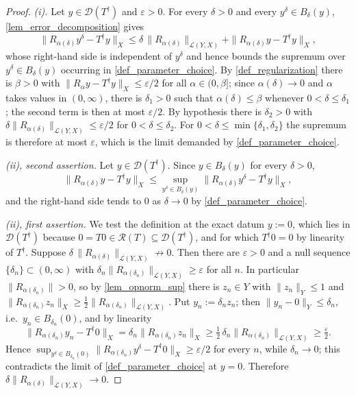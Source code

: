 \documentclass[a4paper]{report}
\theoremstyle{plain}
\theoremstyle{definition}
\theoremstyle{remark}
\newcommand{\Ll}{\mathcal{L}}
\newcommand{\Ran}{\mathcal{R}}
\newcommand{\Dom}{\mathcal{D}}
\newcommand{\dg}{^{\dagger}}
\begin{document}
\begin{proof}
  \emph{(i).}  Let $y \in \Dom(T\dg)$ and $\varepsilon > 0$.  For every $\delta > 0$ and
  every $y^{\delta} \in B_{\delta}(y)$, \cref{lem_error_decomposition} gives
  \[
    \|R_{\alpha(\delta)}y^{\delta} - T\dg y\|_X
      \le \delta\,\|R_{\alpha(\delta)}\|_{\Ll(Y,X)}
        + \|R_{\alpha(\delta)}y - T\dg y\|_X ,
  \]
  whose right-hand side is independent of $y^{\delta}$ and hence bounds the supremum
  over $y^{\delta} \in B_{\delta}(y)$ occurring in \cref{def_parameter_choice}.  By
  \cref{def_regularization} there is $\beta > 0$ with
  $\|R_{\alpha}y - T\dg y\|_X \le \varepsilon/2$ for all $\alpha \in (0,\beta]$; since
  $\alpha(\delta) \to 0$ and $\alpha$ takes values in $(0,\infty)$, there is
  $\delta_1 > 0$ such that $\alpha(\delta) \le \beta$ whenever
  $0 < \delta \le \delta_1$; the second term is then at most $\varepsilon/2$.  By
  hypothesis there is $\delta_2 > 0$
  with $\delta\|R_{\alpha(\delta)}\|_{\Ll(Y,X)} \le \varepsilon/2$ for
  $0 < \delta \le \delta_2$.  For $0 < \delta \le \min\{\delta_1,\delta_2\}$ the supremum
  is therefore at most $\varepsilon$, which is the limit demanded by
  \cref{def_parameter_choice}.

  \emph{(ii), second assertion.}  Let $y \in \Dom(T\dg)$.  Since $y \in B_{\delta}(y)$ for
  every $\delta > 0$,
  \[
    \|R_{\alpha(\delta)}y - T\dg y\|_X
      \le \sup_{y^{\delta} \in B_{\delta}(y)}\|R_{\alpha(\delta)}y^{\delta} - T\dg y\|_X ,
  \]
  and the right-hand side tends to $0$ as $\delta \to 0$ by \cref{def_parameter_choice}.

  \emph{(ii), first assertion.}  We test the definition at the exact datum $y := 0$, which
  lies in $\Dom(T\dg)$ because $0 = T0 \in \Ran(T) \subseteq \Dom(T\dg)$, and for which
  $T\dg 0 = 0$ by linearity of $T\dg$.  Suppose
  $\delta\,\|R_{\alpha(\delta)}\|_{\Ll(Y,X)} \not\to 0$.  Then there are $\varepsilon > 0$
  and a null sequence $\{\delta_n\} \subset (0,\infty)$ with
  $\delta_n\|R_{\alpha(\delta_n)}\|_{\Ll(Y,X)} \ge \varepsilon$ for all $n$.  In
  particular $\|R_{\alpha(\delta_n)}\| > 0$, so by \cref{lem_opnorm_sup} there is
  $z_n \in Y$ with $\|z_n\|_Y \le 1$ and
  $\|R_{\alpha(\delta_n)}z_n\|_X \ge \tfrac12\|R_{\alpha(\delta_n)}\|_{\Ll(Y,X)}$.  Put
  $y_n := \delta_n z_n$; then $\|y_n - 0\|_Y \le \delta_n$, i.e.\
  $y_n \in B_{\delta_n}(0)$, and by linearity
  \[
    \|R_{\alpha(\delta_n)}y_n - T\dg 0\|_X = \delta_n\|R_{\alpha(\delta_n)}z_n\|_X
      \ge \tfrac12\,\delta_n\|R_{\alpha(\delta_n)}\|_{\Ll(Y,X)}
      \ge \tfrac{\varepsilon}{2} .
  \]
  Hence $\sup_{y^{\delta} \in B_{\delta_n}(0)}\|R_{\alpha(\delta_n)}y^{\delta}
  - T\dg 0\|_X \ge \varepsilon/2$ for every $n$, while $\delta_n \to 0$; this contradicts
  the limit of \cref{def_parameter_choice} at $y = 0$.  Therefore
  $\delta\|R_{\alpha(\delta)}\|_{\Ll(Y,X)} \to 0$.
\end{proof}
\end{document}
